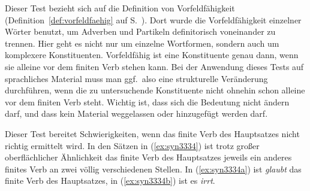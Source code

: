
Dieser Test bezieht sich auf die Definition von Vorfeldfähigkeit (Definition~\ref{def:vorfeldfaehig} auf S.~\pageref{def:vorfeldfaehig}).
Dort wurde die Vorfeldfähigkeit einzelner Wörter benutzt, um Adverben und Partikeln definitorisch voneinander zu trennen.
Hier geht es nicht nur um einzelne Wortformen, sondern auch um komplexere Konstituenten.
Vorfeldfähig ist eine Konstituente genau dann, wenn sie alleine vor dem finiten Verb stehen kann.
Bei der Anwendung dieses Tests auf sprachliches Material muss man ggf.\ also eine strukturelle Veränderung durchführen, wenn die zu untersuchende Konstituente nicht ohnehin schon alleine vor dem finiten Verb steht.
Wichtig ist, dass sich die Bedeutung nicht ändern darf, und dass kein Material weggelassen oder hinzugefügt werden darf.

\begin{exe}
  \ex\label{ex:syn3333}
  \begin{xlist}
  \end{xlist}
\end{exe}

Dieser Test bereitet Schwierigkeiten, wenn das finite Verb des Hauptsatzes nicht richtig ermittelt wird.
In den Sätzen in (\ref{ex:syn3334}) ist trotz großer oberflächlicher Ähnlichkeit das finite Verb des Hauptsatzes jeweils ein anderes finites Verb an zwei völlig verschiedenen Stellen.
In (\ref{ex:syn3334a}) ist \textit{glaubt} das finite Verb des Hauptsatzes, in (\ref{ex:syn3334b}) ist es \textit{irrt}.

\begin{exe}
  \ex\label{ex:syn3334}
  \begin{xlist}
  \end{xlist}
\end{exe}

